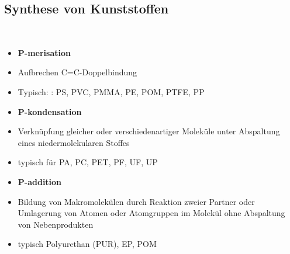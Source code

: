 \documentclass[8.5pt,twocolumn]{extarticle}
\begin{document}
    \subsection{Synthese von Kunststoffen}\mbox{}\\
    \begin{minipage}[t]{0.32\columnwidth}
        \begin{itemize}[label={}, leftmargin=*, itemsep=0.01em]
            \item \textbf{P-merisation}
            \item Aufbrechen C=C-Doppelbindung 
            \item Typisch: : PS, PVC, PMMA, PE, POM, PTFE, PP
        \end{itemize}
    \end{minipage}\hfill
    \begin{minipage}[t]{0.32\columnwidth}
        \begin{itemize}[label={}, leftmargin=*,  itemsep=0.01em]
            \item \textbf{P-kondensation}
            \item Verknüpfung gleicher oder verschiedenartiger Moleküle unter
            Abspaltung eines niedermolekularen Stoffes
            \item typisch für PA, PC, PET, PF, UF, UP
        \end{itemize} 
    \end{minipage}\hfill
    \begin{minipage}[t]{0.32\columnwidth}
        \begin{itemize}[label={}, leftmargin=*, itemsep=0.01em]
            \item \textbf{P-addition}
            \item Bildung von Makromolekülen durch Reaktion zweier Partner oder
            Umlagerung von Atomen oder Atomgruppen im Molekül ohne Abspaltung
            von Nebenprodukten
            \item typisch Polyurethan (PUR), EP, POM
        \end{itemize}
    \end{minipage}\hfill
\end{document}
